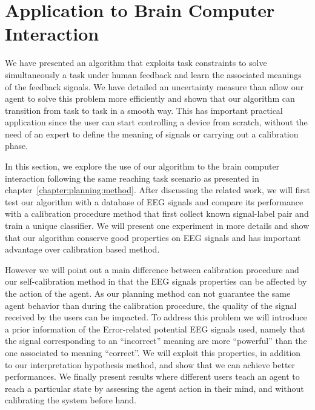 
\chapter{Application to Brain Computer Interaction}
\label{chapter:bci}
\minitoc

We have presented an algorithm that exploits task constraints to solve simultaneously a task under human feedback and learn the associated meanings of the feedback signals. We have detailed an uncertainty measure than allow our agent to solve this problem more efficiently and shown that our algorithm can transition from task to task in a smooth way. This has important practical application since the user can start controlling a device from scratch, without the need of an expert to define the meaning of signals or carrying out a calibration phase. 

In this section, we explore the use of our algorithm to the brain computer interaction following the same reaching task scenario as presented in chapter~\ref{chapter:planning:method}. After discussing the related work, we will first test our algorithm with a database of EEG signals and compare its performance with a calibration procedure method that first collect known signal-label pair and train a unique classifier. We will present one experiment in more details and show that our algorithm conserve good properties on EEG signals and has important advantage over calibration based method. 

However we will point out a main difference between calibration procedure and our self-calibration method in that the EEG signals properties can be affected by the action of the agent. As our planning method can not guarantee the same agent behavior than during the calibration procedure, the quality of the signal received by the users can be impacted. To address this problem we will introduce a prior information of the Error-related potential EEG signals used, namely that the signal corresponding to an ``incorrect'' meaning are more ``powerful'' than the one associated to meaning ``correct''. We will exploit this properties, in addition to our interpretation hypothesis method, and show that we can achieve better performances. We finally present results where different users teach an agent to reach a particular state by assessing the agent action in their mind, and without calibrating the system before hand.

